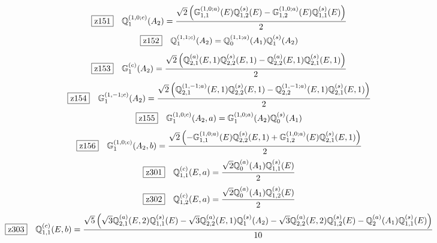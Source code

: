 \documentclass[fleqn,10pt,landscape]{jsarticle}
\begin{document}
\begin{dmath*}
\hspace*{3mm}\fbox{z151}\quad \mathbb{Q}_{1}^{(1,0;c)}(A_{2})=\frac{\sqrt{2} \left(\mathbb{G}_{1,1}^{(1,0;a)}(E) \mathbb{Q}_{1,2}^{(s)}(E) - \mathbb{G}_{1,2}^{(1,0;a)}(E) \mathbb{Q}_{1,1}^{(s)}(E)\right)}{2}
\end{dmath*}
\begin{dmath*}
\hspace*{3mm}\fbox{z152}\quad \mathbb{Q}_{1}^{(1,1;c)}(A_{2})=\mathbb{Q}_{0}^{(1,1;a)}(A_{1}) \mathbb{Q}_{1}^{(s)}(A_{2})
\end{dmath*}
\begin{dmath*}
\hspace*{3mm}\fbox{z153}\quad \mathbb{G}_{1}^{(c)}(A_{2})=\frac{\sqrt{2} \left(\mathbb{Q}_{2,1}^{(a)}(E,1) \mathbb{Q}_{2,2}^{(s)}(E,1) - \mathbb{Q}_{2,2}^{(a)}(E,1) \mathbb{Q}_{2,1}^{(s)}(E,1)\right)}{2}
\end{dmath*}
\begin{dmath*}
\hspace*{3mm}\fbox{z154}\quad \mathbb{G}_{1}^{(1,-1;c)}(A_{2})=\frac{\sqrt{2} \left(\mathbb{Q}_{2,1}^{(1,-1;a)}(E,1) \mathbb{Q}_{2,2}^{(s)}(E,1) - \mathbb{Q}_{2,2}^{(1,-1;a)}(E,1) \mathbb{Q}_{2,1}^{(s)}(E,1)\right)}{2}
\end{dmath*}
\begin{dmath*}
\hspace*{3mm}\fbox{z155}\quad \mathbb{G}_{1}^{(1,0;c)}(A_{2},a)=\mathbb{G}_{1}^{(1,0;a)}(A_{2}) \mathbb{Q}_{0}^{(s)}(A_{1})
\end{dmath*}
\begin{dmath*}
\hspace*{3mm}\fbox{z156}\quad \mathbb{G}_{1}^{(1,0;c)}(A_{2},b)=\frac{\sqrt{2} \left(- \mathbb{G}_{1,1}^{(1,0;a)}(E) \mathbb{Q}_{2,2}^{(s)}(E,1) + \mathbb{G}_{1,2}^{(1,0;a)}(E) \mathbb{Q}_{2,1}^{(s)}(E,1)\right)}{2}
\end{dmath*}
\begin{dmath*}
\hspace*{3mm}\fbox{z301}\quad \mathbb{Q}_{1,1}^{(c)}(E,a)=\frac{\sqrt{2} \mathbb{Q}_{0}^{(a)}(A_{1}) \mathbb{Q}_{1,1}^{(s)}(E)}{2}
\end{dmath*}
\begin{dmath*}
\hspace*{3mm}\fbox{z302}\quad \mathbb{Q}_{1,2}^{(c)}(E,a)=\frac{\sqrt{2} \mathbb{Q}_{0}^{(a)}(A_{1}) \mathbb{Q}_{1,2}^{(s)}(E)}{2}
\end{dmath*}
\begin{dmath*}
\hspace*{3mm}\fbox{z303}\quad \mathbb{Q}_{1,1}^{(c)}(E,b)=\frac{\sqrt{5} \left(\sqrt{3} \mathbb{Q}_{2,1}^{(a)}(E,2) \mathbb{Q}_{1,1}^{(s)}(E) - \sqrt{3} \mathbb{Q}_{2,2}^{(a)}(E,1) \mathbb{Q}_{1}^{(s)}(A_{2}) - \sqrt{3} \mathbb{Q}_{2,2}^{(a)}(E,2) \mathbb{Q}_{1,2}^{(s)}(E) - \mathbb{Q}_{2}^{(a)}(A_{1}) \mathbb{Q}_{1,1}^{(s)}(E)\right)}{10}
\end{dmath*}
\end{document}
